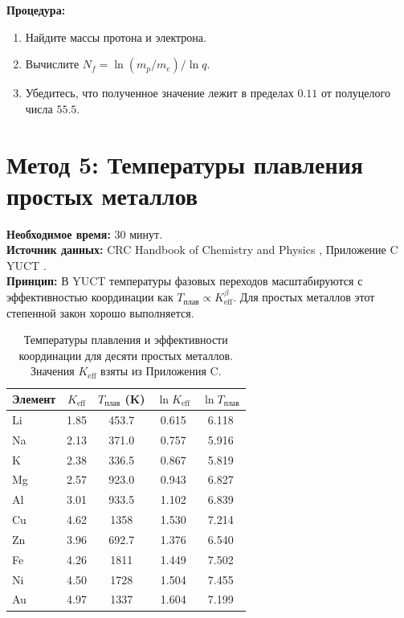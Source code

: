 \documentclass[12pt,a4paper]{article}
\newcommand{\Ke}{K_{\mathrm{eff}}}
\begin{document}
	\textbf{Процедура:}
	\begin{enumerate}[label=(\arabic*)]
		\item Найдите массы протона и электрона.
		\item Вычислите \(N_f = \ln(m_p / m_e) / \ln q\).
		\item Убедитесь, что полученное значение лежит в пределах \(0.11\) от полуцелого числа \(55.5\).
	\end{enumerate}
	
	\section{Метод 5: Температуры плавления простых металлов}
	\label{sec:melting}
	
	\textbf{Необходимое время:} 30 минут.\\
	\textbf{Источник данных:} CRC Handbook of Chemistry and Physics \cite{CRC},
	Приложение C YUCT \cite{AppendixC}.\\
	\textbf{Принцип:} В YUCT температуры фазовых переходов масштабируются с эффективностью координации
	как \(T_{\text{плав}} \propto \Ke^{\beta}\). Для простых металлов этот степенной закон хорошо выполняется.
	
	\begin{table}[H]
		\centering
		\caption{Температуры плавления и эффективности координации для десяти
			простых металлов. Значения \(\Ke\) взяты из Приложения C.}
		\label{tab:melting}
		\begin{tabular}{l c c c c}
			\toprule
			Элемент & \(\Ke\) & \(T_{\text{плав}}\) (K) & \(\ln \Ke\) & \(\ln T_{\text{плав}}\) \\
			\midrule
			Li & 1.85 & 453.7 & 0.615 & 6.118 \\
			Na & 2.13 & 371.0 & 0.757 & 5.916 \\
			K  & 2.38 & 336.5 & 0.867 & 5.819 \\
			Mg & 2.57 & 923.0 & 0.943 & 6.827 \\
			Al & 3.01 & 933.5 & 1.102 & 6.839 \\
			Cu & 4.62 & 1358  & 1.530 & 7.214 \\
			Zn & 3.96 & 692.7 & 1.376 & 6.540 \\
			Fe & 4.26 & 1811  & 1.449 & 7.502 \\
			Ni & 4.50 & 1728  & 1.504 & 7.455 \\
			Au & 4.97 & 1337  & 1.604 & 7.199 \\
			\bottomrule
		\end{tabular}
	\end{table}
	
\end{document}
